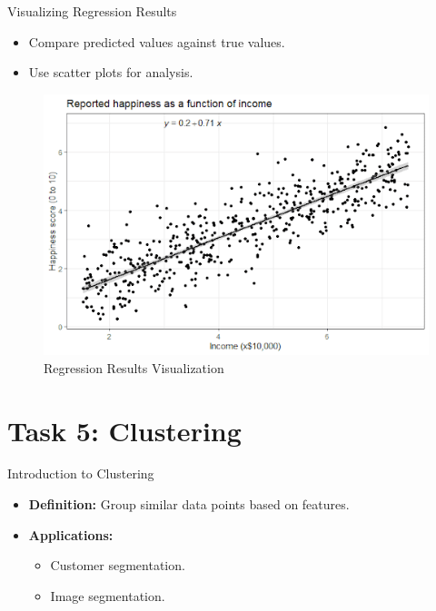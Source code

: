 \documentclass{beamer}
\begin{document}
\begin{frame}{Visualizing Regression Results}
\begin{itemize}
    \item Compare predicted values against true values.
    \item Use scatter plots for analysis.
\end{itemize}
\begin{figure}
    \centering
    \includegraphics[width=0.8\linewidth]{imgs/regression_results.png}
    \caption{Regression Results Visualization}
\end{figure}
\end{frame}

\section{Task 5: Clustering}

\begin{frame}{Introduction to Clustering}
\begin{itemize}
    \item \textbf{Definition:} Group similar data points based on features.
    \item \textbf{Applications:}
    \begin{itemize}
        \item Customer segmentation.
        \item Image segmentation.
    \end{itemize}
\end{itemize}
\end{frame}
\end{document}
